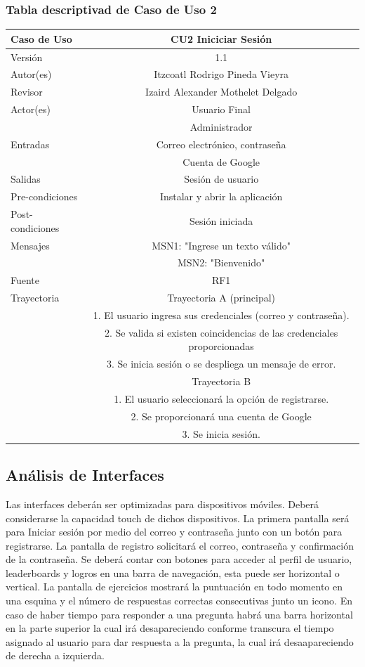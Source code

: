 \documentclass{article}
\begin{document}
\subsubsection{Tabla descriptivad de Caso de Uso 2}
\begin{tabular}{|M{5cm}|c|}
\hline
Caso de Uso & CU2 Iniciciar Sesión\\ \hline
Versión & 1.1\\ \hline
Autor(es) & Itzcoatl Rodrigo Pineda Vieyra\\ \hline
Revisor & Izaird Alexander Mothelet Delgado \\ \hline
Actor(es) & Usuario Final \\ & Administrador\\ \hline
Entradas &  Correo electrónico, contraseña\\ & Cuenta de Google \\ \hline
Salidas & Sesión de usuario \\ \hline
Pre-condiciones & Instalar y abrir la aplicación \\ \hline
Post-condiciones & Sesión iniciada\\ \hline
Mensajes & MSN1: "Ingrese un texto válido"\\
		   & MSN2: "Bienvenido"\\ \hline
Fuente & RF1 \\ \hline	
	Trayectoria & Trayectoria A (principal)\\
		& 1.   El usuario ingresa sus credenciales (correo y contraseña).\\
		& 2.   Se valida si existen coincidencias de las credenciales proporcionadas\\
		& 3. Se inicia sesión o se despliega un mensaje de error.\\
	& Trayectoria B\\
	& 1.   El usuario seleccionará la opción de registrarse.\\
	& 2.   Se proporcionará una cuenta de Google\\
	& 3.   Se inicia sesión.\\ \hline
\end{tabular}

\subsection{Análisis de Interfaces}
Las interfaces deberán ser optimizadas para dispositivos móviles. Deberá considerarse la capacidad touch de dichos dispositivos. La primera pantalla será para Iniciar sesión por medio del correo y contraseña junto con un botón para registrarse. La pantalla de registro solicitará el correo, contraseña y confirmación de la contraseña. Se deberá contar con botones para acceder al perfil de usuario, leaderboards y logros en una barra de navegación, esta puede ser horizontal o vertical. La pantalla de ejercicios mostrará la puntuación en todo momento en una esquina y el número de respuestas correctas consecutivas junto un icono. En caso de haber tiempo para responder a una pregunta habrá una barra horizontal en la parte superior la cual irá desapareciendo conforme transcura el tiempo asignado al usuario para dar respuesta a la pregunta, la cual irá  desaapareciendo de derecha a izquierda.
\end{document}
